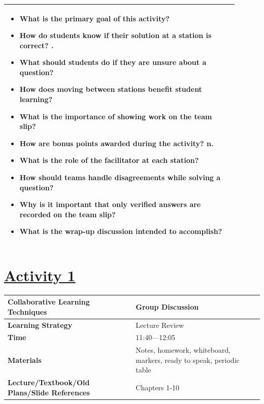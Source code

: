 \documentclass{article}
\begin{document}
\begin{tabular}{|p{0.9\linewidth}|}
\hline
\begin{itemize}
    \item What is the primary goal of this activity?

    
    \item How do students know if their solution at a station is correct?
.
    
    \item What should students do if they are unsure about a question?

    
    \item How does moving between stations benefit student learning?

    
    \item What is the importance of showing work on the team slip?

    
    \item How are bonus points awarded during the activity?
n.
    
    \item What is the role of the facilitator at each station?

    
    \item How should teams handle disagreements while solving a question?

    
    \item Why is it important that only verified answers are recorded on the team slip?

    
    \item What is the wrap-up discussion intended to accomplish?
\end{itemize} \\
\hline
\end{tabular}




\section*{\underline{Activity 1}}
\noindent
\begin{tabular}{|p{4.2cm}|p{9.8cm}|}
\hline
\textbf{Collaborative Learning Techniques} & Group Discussion\\
\hline
\textbf{Learning Strategy} & Lecture Review\\
\hline
\textbf{Time} & 11:40---12:05\\
\hline
\textbf{Materials} & Notes, homework, whiteboard, markers, ready to speak, periodic table \\
\hline
\textbf{Lecture/Textbook/Old Plans/Slide References} & Chapters 1-10\\
\hline
\end{tabular}
\end{document}
